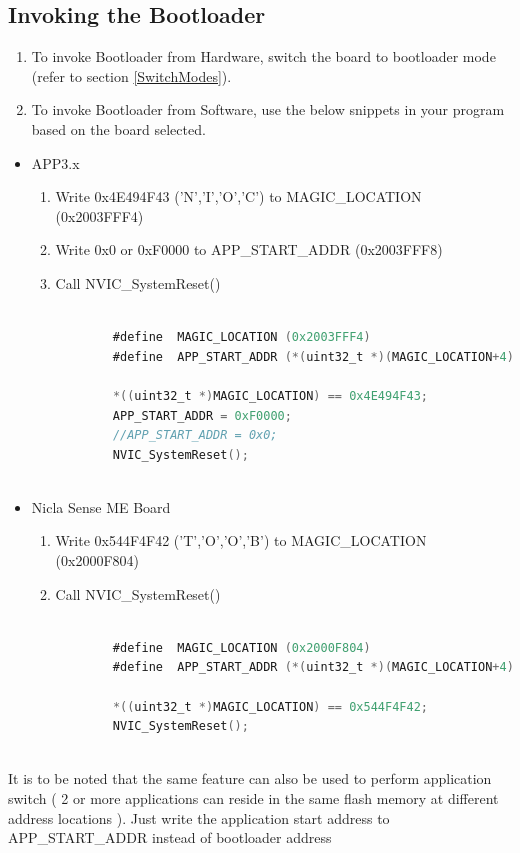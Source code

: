 \documentclass[11pt,headings=small]{scrartcl}
\begin{document}
\subsection{Invoking the Bootloader}
\begin{enumerate}
	\item To invoke Bootloader from Hardware, switch the board to bootloader mode (refer to section \ref{SwitchModes}).
	\item To invoke Bootloader from Software, use the below snippets in your program based on the board selected.
\end{enumerate}

\begin{itemize}
	\item APP3.x
	\begin{enumerate}[label=\roman*.]
		\item Write 0x4E494F43 ('N','I','O','C') to MAGIC\_LOCATION (0x2003FFF4)
		\item Write 0x0 or 0xF0000 to APP\_START\_ADDR (0x2003FFF8)
		\item Call NVIC\_SystemReset()
		\begin{lstlisting}[language=C]
		
		#define  MAGIC_LOCATION (0x2003FFF4)
		#define  APP_START_ADDR (*(uint32_t *)(MAGIC_LOCATION+4)
		 
		*((uint32_t *)MAGIC_LOCATION) == 0x4E494F43;
		APP_START_ADDR = 0xF0000;
		//APP_START_ADDR = 0x0;
		NVIC_SystemReset();
		
		\end{lstlisting}
	\end{enumerate}
\end{itemize}

\begin{itemize}
	\item Nicla Sense ME Board
	\begin{enumerate}[label=\roman*.]
		\item Write 0x544F4F42 ('T','O','O','B') to MAGIC\_LOCATION (0x2000F804)
		\item Call NVIC\_SystemReset()
		\begin{lstlisting}[language=C]
		
		#define  MAGIC_LOCATION (0x2000F804)
		#define  APP_START_ADDR (*(uint32_t *)(MAGIC_LOCATION+4)
		 
		*((uint32_t *)MAGIC_LOCATION) == 0x544F4F42;
		NVIC_SystemReset();
		
		\end{lstlisting}
	\end{enumerate}
\end{itemize}
It is to be noted that the same feature can also be used to perform application switch ( 2 or more applications can reside in the same flash memory at different address locations ). Just write the application start address to APP\_START\_ADDR instead of bootloader address
\end{document}
